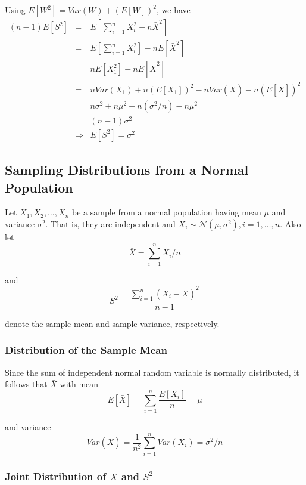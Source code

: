 \documentclass[12pt]{article}
\begin{document}
Using $E[W^2] = Var(W) + (E[W])^2$, we have
\begin{eqnarray*}
  (n-1)E[S^2]
  &=& E \left[ \sum_{i=1}^n X_i^2 - n \bar{X}^2 \right] \\
  &=& E \left[ \sum_{i=1}^n X_i^2 \right] - n E[\bar{X}^2] \\
  &=& n E[X_1^2] - n E[\bar{X}^2] \\
  &=& n Var(X_1) + n (E[X_1])^2 - n Var(\bar{X}) - n (E[\bar{X}])^2 \\
  &=& n \sigma^2 + n \mu^2 - n (\sigma^2 / n) - n \mu^2 \\
  &=& (n-1) \sigma^2 \\
  &\Rightarrow& E[S^2] = \sigma^2
\end{eqnarray*}

\subsection{Sampling Distributions from a Normal Population}

Let $X_1, X_2, \dots, X_n$ be a sample from a normal population having mean $\mu$ and variance $\sigma^2$. That is, they are independent and $X_i \sim \mathcal{N}(\mu, \sigma^2), i=1,\dots,n$. Also let
\begin{equation*}
  \bar{X} = \sum_{i=1}^n X_i / n
\end{equation*}

and
\begin{equation*}
  S^2 = \frac {\sum_{i=1}^n (X_i - \bar{X})^2}{n-1}
\end{equation*}

denote the sample mean and sample variance, respectively.

\subsubsection{Distribution of the Sample Mean}

Since the sum of independent normal random variable is normally distributed, it follows that $\bar{X}$ with mean
\begin{equation*}
  E[\bar{X}] = \sum_{i=1}^n \frac {E[X_i]}{n} = \mu
\end{equation*}

and variance
\begin{equation*}
  Var(\bar{X}) = \frac{1}{n^2} \sum_{i=1}^n Var(X_i) = \sigma^2 / n
\end{equation*}

\subsubsection{Joint Distribution of $\bar{X}$ and $S^2$}
\end{document}
